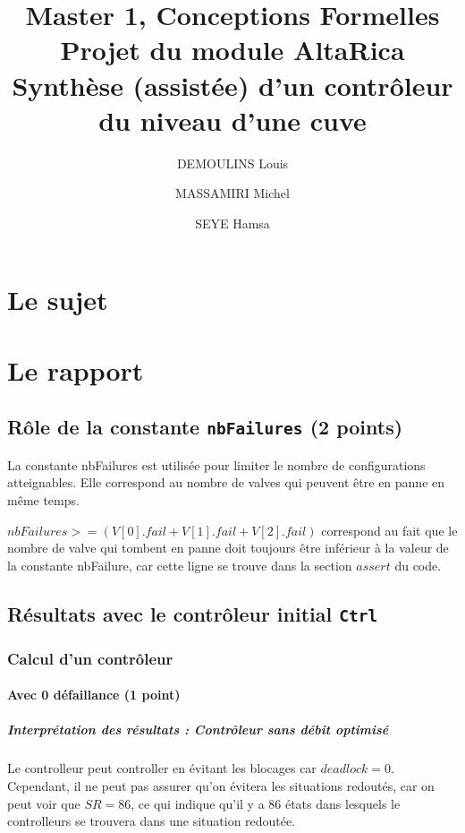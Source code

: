 \documentclass[a4paper]{book}
\newcommand{\altarica}{{\sc AltaRica}}
\begin{document}
\title{Master 1, Conceptions Formelles\\
Projet du module \altarica\\
Synthèse (assistée) d'un contrôleur du niveau d'une cuve}

\date{}

\author{DEMOULINS Louis \and MASSAMIRI Michel \and SEYE Hamsa}

\maketitle

\chapter{Le sujet}


\chapter{Le rapport}
\section{Rôle de la constante {\tt nbFailures} (2 points)}
La constante nbFailures est utilisée pour limiter le nombre de configurations atteignables. Elle correspond au nombre de valves qui peuvent être en panne en même temps.

$nbFailures >= (V[0].fail + V[1].fail + V[2].fail)$ correspond au fait que le nombre de valve qui tombent en panne doit toujours être inférieur à la valeur de la constante nbFailure, car cette ligne se trouve dans la section $assert$ du code.

\section{Résultats avec le contrôleur initial {\tt Ctrl}}
\subsection{Calcul d'un contrôleur}
\subsubsection{Avec 0 défaillance (1 point)}


%
%
%
\paragraph{Interprétation des résultats : Contrôleur sans débit optimisé}
Le controlleur peut controller en évitant les blocages car $deadlock = 0$. Cependant, il ne peut pas assurer qu'on évitera les situations redoutés,
car on peut voir que $SR = 86$, ce qui indique qu'il y a 86 états dans lesquels le controlleurs se trouvera dans une situation redoutée.
\end{document}
